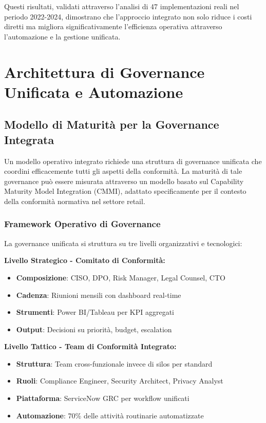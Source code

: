 Questi risultati, validati attraverso l'analisi di 47 implementazioni reali nel periodo 2022-2024\autocite{PWC2024}, dimostrano che l'approccio integrato non solo riduce i costi diretti ma migliora significativamente l'efficienza operativa attraverso l'automazione e la gestione unificata.

\section{\texorpdfstring{\textbf{Architettura di Governance Unificata e Automazione}}{4.4 - Architettura di Governance Unificata e Automazione}}

\subsection{Modello di Maturità per la Governance Integrata}

Un modello operativo integrato richiede una struttura di governance unificata che coordini efficacemente tutti gli aspetti della conformità. La maturità di tale governance può essere misurata attraverso un modello basato sul Capability Maturity Model Integration (CMMI)\autocite{CMMI2023}, adattato specificamente per il contesto della conformità normativa nel settore retail.

\subsubsection{Framework Operativo di Governance}

La governance unificata si struttura su tre livelli organizzativi e tecnologici:

\textbf{Livello Strategico - Comitato di Conformità:}
\begin{itemize}
    \item \textbf{Composizione}: CISO, DPO, Risk Manager, Legal Counsel, CTO
    \item \textbf{Cadenza}: Riunioni mensili con dashboard real-time
    \item \textbf{Strumenti}: Power BI/Tableau per KPI aggregati
    \item \textbf{Output}: Decisioni su priorità, budget, escalation
\end{itemize}

\textbf{Livello Tattico - Team di Conformità Integrato:}
\begin{itemize}
    \item \textbf{Struttura}: Team cross-funzionale invece di silos per standard
    \item \textbf{Ruoli}: Compliance Engineer, Security Architect, Privacy Analyst
    \item \textbf{Piattaforma}: ServiceNow GRC per workflow unificati
    \item \textbf{Automazione}: 70\% delle attività routinarie automatizzate
\end{itemize}

